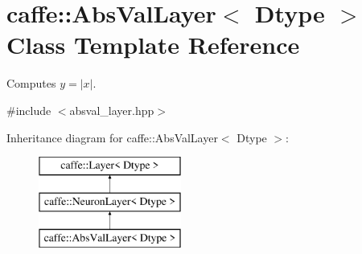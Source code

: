 \hypertarget{classcaffe_1_1AbsValLayer}{}\section{caffe\+:\+:Abs\+Val\+Layer$<$ Dtype $>$ Class Template Reference}
\label{classcaffe_1_1AbsValLayer}


Computes $ y = |x| $.  




{\ttfamily \#include $<$absval\+\_\+layer.\+hpp$>$}

Inheritance diagram for caffe\+:\+:Abs\+Val\+Layer$<$ Dtype $>$\+:\begin{figure}[H]
\begin{center}
\leavevmode
\includegraphics[height=3.000000cm]{classcaffe_1_1AbsValLayer}
\end{center}
\end{figure}
